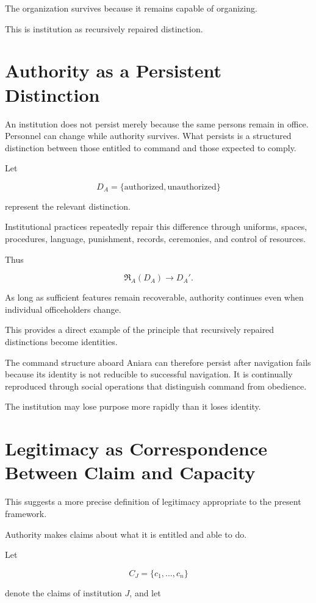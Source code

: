 \documentclass[11pt,oneside]{book}
\theoremstyle{definition}
\theoremstyle{remark}
\newcommand{\Repair}{\mathfrak{R}}
\begin{document}
The organization survives because it remains capable of organizing.

This is institution as recursively repaired distinction.

\section{Authority as a Persistent Distinction}

An institution does not persist merely because the same persons remain in office. Personnel can change while authority survives. What persists is a structured distinction between those entitled to command and those expected to comply.

Let

\[
D_A
=
\{\text{authorized},\text{unauthorized}\}
\]

represent the relevant distinction.

Institutional practices repeatedly repair this difference through uniforms, spaces, procedures, language, punishment, records, ceremonies, and control of resources.

Thus

\[
\Repair_A(D_A)
\rightarrow
D_A'.
\]

As long as sufficient features remain recoverable, authority continues even when individual officeholders change.

This provides a direct example of the principle that recursively repaired distinctions become identities.

The command structure aboard Aniara can therefore persist after navigation fails because its identity is not reducible to successful navigation. It is continually reproduced through social operations that distinguish command from obedience.

The institution may lose purpose more rapidly than it loses identity.

\section{Legitimacy as Correspondence Between Claim and Capacity}

This suggests a more precise definition of legitimacy appropriate to the present framework.

Authority makes claims about what it is entitled and able to do.

Let

\[
C_J
=
\{c_1,\ldots,c_n\}
\]

denote the claims of institution \(J\), and let
\end{document}
